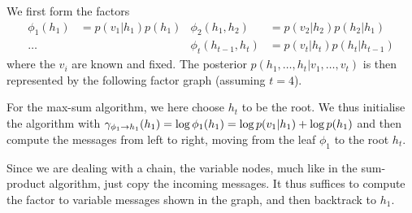 \begin{solution}
  
  We first form the factors
  \begin{align}
    \phi_1(h_1) &= p(v_1|h_1) p(h_1)& \phi_2(h_1, h_2) &= p(v_2|h_2) p(h_2|h_1)\\
    \ldots      &                  & \phi_t(h_{t-1},h_t) &= p(v_t|h_t) p(h_{t}|h_{t-1})
  \end{align}
 where the $v_i$ are known and fixed. The posterior $p(h_1, \ldots,
 h_t | v_1, \ldots, v_t)$ is then represented by the following factor
 graph (assuming $t=4$).
  
  \begin{center}
  \end{center}

  For the max-sum algorithm, we here choose $h_t$ to be the root. We
  thus initialise the algorithm with $\mfxmess{\phi_1}{h_1}{1}(h_1) =
  \log \phi_1(h_1) = \log p(v_1|h_1) + \log p(h_1)$ and then compute the
  messages from left to right, moving from the leaf $\phi_1$ to the
  root $h_t$.

  Since we are dealing with a chain, the variable nodes, much like in
  the sum-product algorithm, just copy the incoming messages. It thus
  suffices to compute the factor to variable messages shown in the
  graph, and then backtrack to $h_1$.
  
 \begin{center}
\end{center}
\end{solution}
